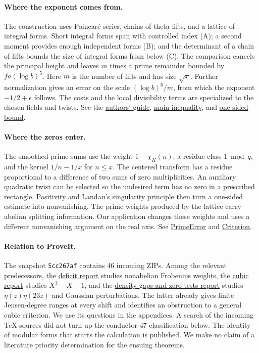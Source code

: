 \documentclass[11pt]{article}
\newcommand{\src}[2]{\href{https://github.com/lsernau/grh-lean/blob/72fead102f663d5c7a407964a13dc0cf9d977207/grh/#1}{#2}}
\newcommand{\incoming}[2]{\href{https://github.com/VladimirReshetnikov/ProveIt/blob/5cc267af75a635199ac5d93a7d49cbce521daefc/docs/incoming/#1}{#2}}
\begin{document}
\paragraph{Where the exponent comes from.}
The construction uses Poincar\'e series, chains of theta lifts, and a lattice of integral forms. Short integral forms span with controlled index (A); a second moment provides enough independent forms (B); and the determinant of a chain of lifts bounds the size of integral forms from below (C). The comparison cancels the principal height and leaves $m$ times a prime remainder bounded by $fa(\log b)^5$. Here $m$ is the number of lifts and has size $\sqrt x$. Further normalization gives an error on the scale $(\log b)^6/m$, from which the exponent $-1/2+\epsilon$ follows. The costs and the local divisibility terms are specialized to the chosen fields and twists. See the \src{GUIDE.md}{authors' guide}, \src{src/New/Reduction/MainInequality.lean}{main inequality}, and \src{src/New/Reduction/OneSidedBound.lean}{one-sided bound}.

\paragraph{Where the zeros enter.}
The smoothed prime sums use the weight $1-\chi_K(n)$, a residue class $1\bmod q$, and the kernel $1/n-1/x$ for $n\le x$. The centered transform has a residue proportional to a difference of two sums of zero multiplicities. An auxiliary quadratic twist can be selected so the undesired term has no zero in a prescribed rectangle. Positivity and Landau's singularity principle then turn a one-sided estimate into nonvanishing. The prime weights produced by the lattice carry abelian splitting information. Our application changes these weights and uses a different nonvanishing argument on the real axis. See \src{src/New/Reduction/Zeros/PrimeError.lean}{PrimeError} and \src{src/New/Reduction/Zeros/Criterion.lean}{Criterion}.

\paragraph{Relation to ProveIt.}
The snapshot \texttt{5cc267af} contains 46 incoming ZIPs. Among the relevant predecessors, the \incoming{grh_deficit_transfer_2026-11-25.zip}{deficit report} studies nonabelian Frobenius weights, the \incoming{grh-progression-densities-and-cubic-prime-race.zip}{cubic report} studies $X^3-X-1$, and the \incoming{grh_transfers_density_gaps_and_zero_tests.zip}{density-gaps and zero-tests report} studies $\eta(z)\eta(23z)$ and Gaussian perturbations. The latter already gives finite Jensen-degree ranges at every shift and identifies an obstruction to a general cubic criterion. We use its questions in the appendices. A search of the incoming TeX sources did not turn up the conductor-$47$ classification below. The identity of modular forms that starts the calculation is published. We make no claim of a literature priority determination for the ensuing theorems.
\end{document}
